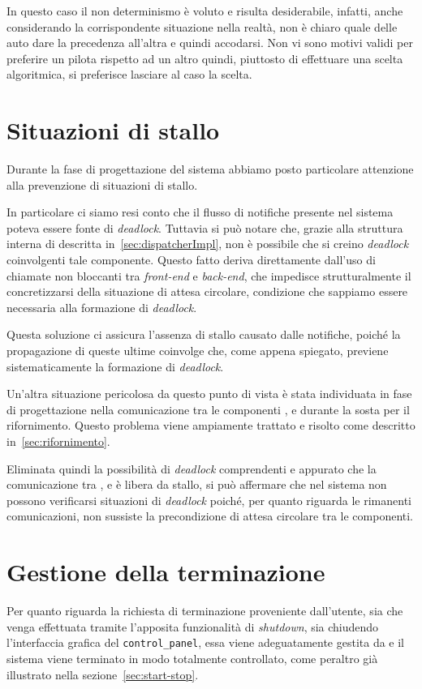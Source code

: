 In questo caso il non determinismo è voluto e risulta desiderabile, infatti, anche considerando la corrispondente situazione nella realtà, non è chiaro quale delle auto dare la precedenza all'altra e quindi accodarsi.
Non vi sono motivi validi per preferire un pilota rispetto ad un altro quindi, piuttosto di effettuare una scelta algoritmica, si preferisce lasciare al caso la scelta.

\section{Situazioni di stallo}
Durante la fase di progettazione del sistema abbiamo posto particolare attenzione alla prevenzione di situazioni di stallo.

In particolare ci siamo resi conto che il flusso di notifiche presente nel sistema poteva essere fonte di \textit{deadlock}.
Tuttavia si può notare che, grazie alla struttura interna di \evdisp{} descritta in~\ref{sec:dispatcherImpl}, non è possibile che si creino \textit{deadlock} coinvolgenti tale componente.
Questo fatto deriva direttamente dall'uso di chiamate non bloccanti tra \textit{front-end} e \textit{back-end}, che impedisce strutturalmente il concretizzarsi della situazione di attesa circolare, condizione che sappiamo essere necessaria alla formazione di \textit{deadlock}.

Questa soluzione ci assicura l'assenza di stallo causato dalle notifiche, poiché la propagazione di queste ultime coinvolge \evdisp{} che, come appena spiegato, previene sistematicamente la formazione di \textit{deadlock}.

Un'altra situazione pericolosa da questo punto di vista è stata individuata in fase di progettazione nella comunicazione tra le componenti \track{}, \team{} e \car{} durante la sosta per il rifornimento. Questo problema viene ampiamente trattato e risolto come descritto in~\ref{sec:rifornimento}.

Eliminata quindi la possibilità di \textit{deadlock} comprendenti \evdisp{} e appurato che la comunicazione tra \track{}, \team{} e \car{} è libera da stallo, si può affermare che nel sistema non possono verificarsi situazioni di \textit{deadlock} poiché, per quanto riguarda le rimanenti comunicazioni, non sussiste la precondizione di attesa circolare tra le componenti.

\section{Gestione della terminazione}
Per quanto riguarda la richiesta di terminazione proveniente dall'utente, sia che venga effettuata tramite l'apposita funzionalità di \textit{shutdown}, sia chiudendo l'interfaccia grafica del \texttt{control\_panel}, essa viene adeguatamente gestita da \bootserv{} e il sistema viene terminato in modo totalmente controllato, come peraltro già illustrato nella sezione~\ref{sec:start-stop}.

